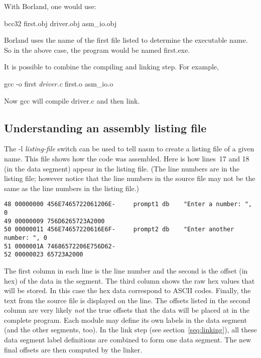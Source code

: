 {With Borland,  one would use:
\begin{CodeQuote}
bcc32 first.obj driver.obj asm\_io.obj
\end{CodeQuote}
Borland uses the name of the first file listed to determine the executable
name. So in the above case, the program would be named {\code first.exe}.

It is possible to combine the compiling and linking step. For example,
\begin{CodeQuote}
gcc -o first {\em driver.c} first.o asm\_io.o
\end{CodeQuote}
Now {\code gcc} will compile {\code driver.c} and then link.

\subsection{Understanding an assembly listing file }

The {\code -l {\em listing-file}} switch can be used to tell {\code
nasm} to create a listing file of a given name. This file shows how
the code was assembled. Here is how lines~17 and 18 (in the data
segment) appear in the listing file. (The line numbers are in the
listing file; however notice that the line numbers in the source file
may not be the same as the line numbers in the listing file.)
\begin{Verbatim}[xleftmargin=\AsmMargin]
48 00000000 456E7465722061206E-     prompt1 db    "Enter a number: ", 0
49 00000009 756D6265723A2000
50 00000011 456E74657220616E6F-     prompt2 db    "Enter another number: ", 0
51 0000001A 74686572206E756D62-
52 00000023 65723A2000
 \end{Verbatim}
The first column in each line is the line number and the second is the
offset (in hex) of the data in the segment. The third column shows the
raw hex values that will be stored. In this case the hex data
correspond to ASCII codes. Finally, the text from the source file is
displayed on the line. The offsets listed in the second column are
very likely \emph{not} the true offsets that the data will be placed
at in the complete program.  Each module may define its own labels in
the data segment (and the other segments, too). In the link step (see
section~\ref{seq:linking}), all these data segment label definitions
are combined to form one data segment. The new final offsets are then
computed by the linker.

}
